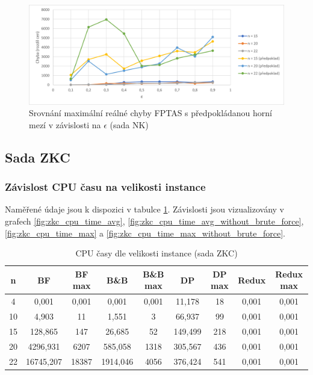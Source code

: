 \documentclass[12pt]{article}
\begin{document}
\begin{figure}[ht]\centering
    \includegraphics[width=1\textwidth, keepaspectratio]{graphs/NK/fptas/nk_fptas_eps_error_comparison.png}
    \caption{Srovnání maximální reálné chyby FPTAS s předpokládanou horní mezí v závislosti na $\epsilon$ (sada NK)}
    \label{fig:nk_fptas_eps_error_comparison}
\end{figure}

\subsection{Sada ZKC}

\subsubsection{Závislost CPU času na velikosti instance}

Naměřené údaje jsou k dispozici v tabulce \ref{tab:zkc_cpu_times}. Závislosti jsou vizualizovány v grafech \ref{fig:zkc_cpu_time_avg}, \ref{fig:zkc_cpu_time_avg_without_brute_force}, \ref{fig:zkc_cpu_time_max} a \ref{fig:zkc_cpu_time_max_without_brute_force}.

\begin{table}
    \begin{center}
         \begin{tabular}{|c | c | c | c| c | c | c | c | c|} 
         \hline
         n & BF & BF max & B\&B & B\&B max & DP & DP max & Redux & Redux max \\ [0.1ex] 
         \hline\hline
        4 & 0,001 & 0,001 & 0,001 & 0,001 & 11,178 & 18 & 0,001 & 0,001 \\
        \hline
        10 & 4,903 & 11 & 1,551 & 3 & 66,937 & 99 & 0,001 & 0,001 \\
        \hline
        15 & 128,865 & 147 & 26,685 & 52 & 149,499 & 218 & 0,001 & 0,001 \\
        \hline
        20 & 4296,931 & 6207 & 585,058 & 1318 & 305,567 & 436 & 0,001 & 0,001 \\
        \hline
        22 & 16745,207 & 18387 & 1914,046 & 4056 & 376,424 & 541 & 0,001 & 0,001 \\
        \hline
        \end{tabular}
        \caption{CPU časy dle velikosti instance (sada ZKC)}
        \label{tab:zkc_cpu_times}
    \end{center}
\end{table}
\end{document}
